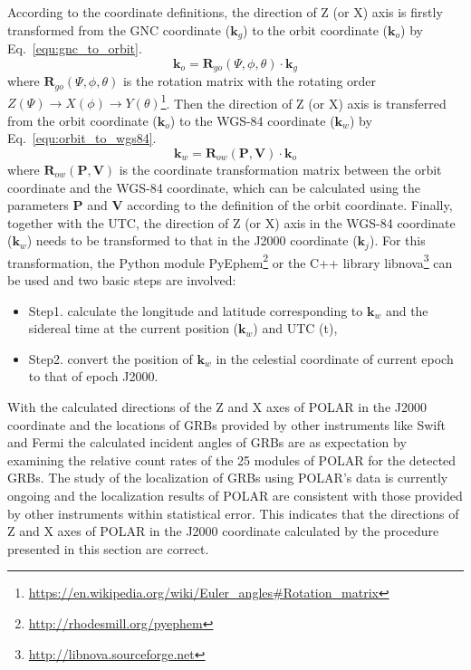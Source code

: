\documentclass{raa}
\begin{document}
According to the coordinate definitions, the direction of Z (or X) axis is firstly transformed from the GNC coordinate ($\bm{k}_g$) to the orbit coordinate ($\bm{k}_o$) by Eq.~\eqref{equ:gnc_to_orbit}.
\begin{equation}\label{equ:gnc_to_orbit}
\bm{k}_o = \bm{R}_{go}(\Psi, \phi, \theta) \cdot \bm{k}_g
\end{equation}
where $\bm{R}_{go}(\Psi, \phi, \theta)$ is the rotation matrix with the rotating order $Z(\Psi) \rightarrow X(\phi) \rightarrow Y(\theta)$\footnote{\url{https://en.wikipedia.org/wiki/Euler\_angles\#Rotation\_matrix}}. Then the direction of Z (or X) axis is transferred from the orbit coordinate ($\bm{k}_o$) to the WGS-84 coordinate ($\bm{k}_w$) by Eq.~\eqref{equ:orbit_to_wgs84}.
\begin{equation}\label{equ:orbit_to_wgs84}
\bm{k}_w = \bm{R}_{ow}(\bm{P}, \bm{V}) \cdot \bm{k}_o
\end{equation}
where $\bm{R}_{ow}(\bm{P}, \bm{V})$ is the coordinate transformation matrix between the orbit coordinate and the WGS-84 coordinate, which can be calculated using the parameters $\bm{P}$ and $\bm{V}$ according to the definition of the orbit coordinate. Finally, together with the UTC, the direction of Z (or X) axis in the WGS-84 coordinate ($\bm{k}_w$) needs to be transformed to that in the J2000 coordinate ($\bm{k}_j$). For this transformation, the Python module PyEphem\footnote{\url{http://rhodesmill.org/pyephem}} or the C++ library libnova\footnote{\url{http://libnova.sourceforge.net}} can be used and two basic steps are involved:
\begin{itemize}
\item Step1. calculate the longitude and latitude corresponding to $\bm{k}_w$ and the sidereal time at the current position ($\bm{k}_w$) and UTC (t),
\item Step2. convert the position of $\bm{k}_w$ in the celestial coordinate of current epoch to that of epoch J2000.
\end{itemize}

With the calculated directions of the Z and X axes of POLAR in the J2000 coordinate and the locations of GRBs provided by other instruments like Swift and Fermi the calculated incident angles of GRBs are as expectation by examining the relative count rates of the 25 modules of POLAR for the detected GRBs. The study of the localization of GRBs using POLAR's data is currently ongoing and the localization results of POLAR are consistent with those provided by other instruments within statistical error. This indicates that the directions of Z and X axes of POLAR in the J2000 coordinate calculated by the procedure presented in this section are correct.
\end{document}
